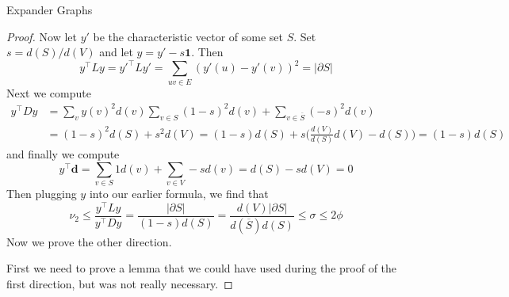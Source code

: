 \documentclass{article}
\begin{document}
\begin{section}{Expander Graphs}
\begin{proof}
     Now let $y'$ be the characteristic vector of some set $S$.
     Set $s = d(S)/d(V)$ and let $y = y' - s \mathbf 1$.
     Then
     $$
     y^\intercal L y = y'^\intercal L y' = \sum_{uv \in E}(y'(u) - y'(v))^2 = |\partial S|
     $$
     Next we compute
     \begin{equation}
       \begin{aligned}
	 y^\intercal D y &= \sum_v y(v)^2d(v) \sum_{v \in S}(1-s)^2d(v) + \sum_{v \in \overline S}(-s)^2d(v)\\
	 ~&= (1-s)^2d(S) + s^2d(V) = (1-s)d(S) + s\big(\frac{d(V)}{d(S)}d(V) - d(S)\big) = (1-s)d(S)
       \end{aligned}
     \end{equation}
     and finally we compute
     $$
     y^\intercal \mathbf d = \sum_{v \in S}1d(v) + \sum_{v \in V}-sd(v) = d(S) - sd(V) = 0
     $$
     Then plugging $y$ into our earlier formula, we find that
     $$
     \nu_2 \leq \frac{y^\intercal L y}{y^\intercal D y} = \frac{|\partial S|}{(1-s)d(S)} = \frac{d(V)|\partial S|}{d(\overline S)d(S)} \leq \sigma \leq 2\phi
     $$
     Now we prove the other direction.

     First we need to prove a lemma that we could have used during the proof of the first direction, but was not really necessary.
     

\end{proof}
\end{section}
\end{document}
